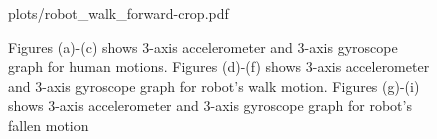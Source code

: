 \documentclass[letterpaper]{article}
\begin{document}
\begin{figure}[!t]
{{plots/robot_walk_forward-crop.pdf}}
\\

\caption{Figures (a)-(c) shows 3-axis accelerometer and 3-axis gyroscope graph for human motions. Figures (d)-(f) shows 3-axis accelerometer and 3-axis gyroscope graph for robot's walk motion. Figures (g)-(i) shows 3-axis accelerometer and 3-axis gyroscope graph for robot's fallen motion}
 \label{fig:anotation-human-robot} 
\end{figure}
\end{document}
